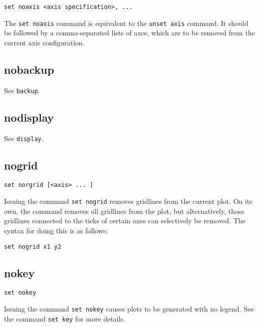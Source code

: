\documentclass[a4paper,onecolumn,11pt]{book}
\begin{document}
\begin{verbatim}
set noaxis <axis specification>, ...
\end{verbatim}

The {\tt set noaxis} command is equivalent to the {\tt unset axis} command. It
should be followed by a comma-separated lists of axes, which are to be removed
from the current axis configuration.


\subsection{nobackup}

See {\tt backup}.


\subsection{nodisplay}

See {\tt display}.


\subsection{nogrid}

\begin{verbatim}
set norgrid [<axis> ... ]
\end{verbatim}

Issuing the command {\tt set nogrid} removes gridlines from the current plot. On
its own, the command removes all gridlines from the plot, but alternatively,
those gridlines connected to the ticks of certain axes can selectively be
removed.  The syntax for doing this is as follows:

\begin{verbatim}
set nogrid x1 y2
\end{verbatim}


\subsection{nokey}

\begin{verbatim}
set nokey
\end{verbatim}

Issuing the command {\tt set nokey} causes plots to be generated with no legend.
See the command {\tt set key} for more details.
\end{document}
